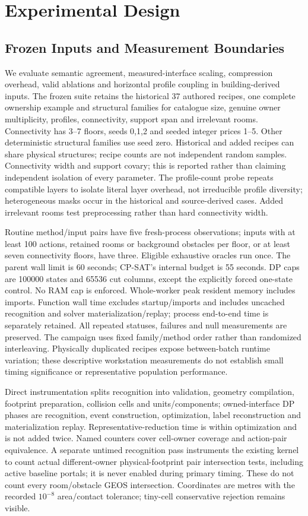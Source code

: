 \section{Experimental Design}
\subsection{Frozen Inputs and Measurement Boundaries}
We evaluate semantic agreement, measured-interface scaling, compression overhead, valid ablations and horizontal profile coupling in building-derived inputs. The frozen suite retains the historical 37 authored recipes, one complete ownership example and structural families for catalogue size, genuine owner multiplicity, profiles, connectivity, support span and irrelevant rooms. Connectivity has 3--7 floors, seeds 0,1,2 and seeded integer prices 1--5. Other deterministic structural families use seed zero. Historical and added recipes can share physical structures; recipe counts are not independent random samples. Connectivity width and support covary; this is reported rather than claiming independent isolation of every parameter. The profile-count probe repeats compatible layers to isolate literal layer overhead, not irreducible profile diversity; heterogeneous masks occur in the historical and source-derived cases. Added irrelevant rooms test preprocessing rather than hard connectivity width.

Routine method/input pairs have five fresh-process observations; inputs with at least 100 actions, retained rooms or background obstacles per floor, or at least seven connectivity floors, have three. Eligible exhaustive oracles run once. The parent wall limit is 60 seconds; CP-SAT's internal budget is 55 seconds. DP caps are 100000 states and 65536 cut columns, except the explicitly forced one-state control. No RAM cap is enforced. Whole-worker peak resident memory includes imports. Function wall time excludes startup/imports and includes uncached recognition and solver materialization/replay; process end-to-end time is separately retained. All repeated statuses, failures and null measurements are preserved. The campaign uses fixed family/method order rather than randomized interleaving. Physically duplicated recipes expose between-batch runtime variation; these descriptive workstation measurements do not establish small timing significance or representative population performance.

Direct instrumentation splits recognition into validation, geometry compilation, footprint preparation, collision cells and units/components; owned-interface DP phases are recognition, event construction, optimization, label reconstruction and materialization replay. Representative-reduction time is within optimization and is not added twice. Named counters cover cell-owner coverage and action-pair equivalence. A separate untimed recognition pass instruments the existing kernel to count actual different-owner physical-footprint pair intersection tests, including active baseline portals; it is never enabled during primary timing. These do not count every room/obstacle GEOS intersection. Coordinates are metres with the recorded $10^{-8}$ area/contact tolerance; tiny-cell conservative rejection remains visible.

